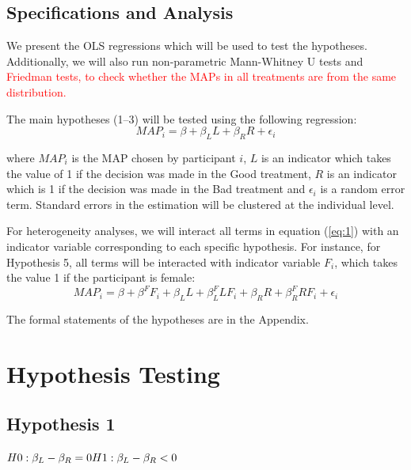 \subsection{Specifications and Analysis}
We present the OLS regressions which will be used to test the hypotheses.
Additionally, we will also run non-parametric Mann-Whitney U tests and \textcolor{red}{Friedman tests, to check whether the MAPs in all treatments are from the same distribution.}

The main hypotheses (1--3) will be tested using the following regression:
\begin{equation} \label{eq:1}
MAP_i = \beta + \beta_L L + \beta_R R + \epsilon_i
\end{equation}

\noindent where $MAP_i$ is the MAP chosen by participant $i$, $L$ is an indicator which takes the value of 1 if the decision was made in the Good treatment, $R$ is an indicator which is 1 if the decision was made in the Bad treatment and $\epsilon_i$ is a random error term.
Standard errors in the estimation will be clustered at the individual level.

For heterogeneity analyses, we will interact all terms in equation (\ref{eq:1}) with an indicator variable corresponding to each specific hypothesis.
For instance, for Hypothesis 5, all terms will be interacted with indicator variable $F_i$, which takes the value 1 if the participant is female:
\begin{equation} \label{eq:2}
MAP_i = \beta + \beta^F F_i + \beta_L L + \beta_L^F L F_i + \beta_R R + \beta_R^F R F_i + \epsilon_i
\end{equation}

The formal statements of the hypotheses are in the Appendix.

\clearpage
\pagebreak



\clearpage
\pagebreak

\appendix
\section{Hypothesis Testing}
\label{section:appendixa}
\setcounter{figure}{0}
\setcounter{table}{0}
\renewcommand{\thefigure}{A.\arabic{figure}}
\renewcommand{\thetable}{A.\arabic{table}}

\subsection{Hypothesis 1}
$H0: \beta_L - \beta_R = 0 \\
H1: \beta_L - \beta_R < 0$


